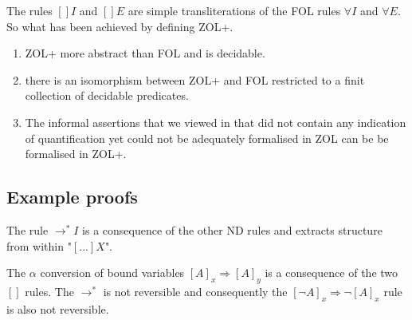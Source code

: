 The rules $[] I$ and $[] E$ are simple transliterations of the FOL rules $\forall I$ and $\forall E$. So what has been achieved by defining ZOL+.
\begin{enumerate}
\item ZOL+ more abstract than FOL and is decidable.
\item there is an isomorphism between ZOL+ and FOL restricted to a finit collection of decidable predicates. 
\item The informal assertions that we viewed in \sref{} that did not contain any indication of quantification yet could not be adequately formalised in ZOL can be be formalised in ZOL+.
\end{enumerate}









\subsection{Example proofs}
\hspace{\fill}
\begin{minipage}{1in}
\begin{prooftree}
 
\end{prooftree} 
\end{minipage}
\hspace{\fill}
\begin{minipage}{2in}
\begin{prooftree}
 
 

 
 
 
\end{prooftree}
\end{minipage}
\hspace{\fill}

The rule $\rightarrow^* I$  is a consequence of the other ND rules and extracts structure from within "$[...]X$".  



The $\alpha$ conversion of bound variables $[A]_x \Rightarrow [A]_y$ is a consequence of the two $[]$ rules. The $\rightarrow^*$ is not reversible and consequently the $[\neg A]_x \Rightarrow \neg[A]_x$ rule is also not reversible.

